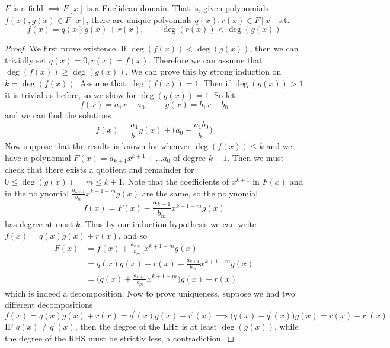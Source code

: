   \begin{theorem}
    $F$ is a field $\implies F[x]$ is a Euclidean domain. That is, given polynomials $f(x), g(x) \in F[x]$, there are unique polyomials $q(x), r(x) \in F[x]$ s.t. 
    \begin{equation}
      f(x) = q(x) g(x) + r(x), \qquad \deg(r(x)) < \deg(g(x))
    \end{equation} 
  \end{theorem} 
  \begin{proof}
    We first prove existence. If $\deg(f(x)) < \deg(g(x))$, then we can trivially set $q(x) = 0, r(x) = f(x)$. Therefore we can assume that $\deg(f(x)) \geq \deg(g(x))$. We can prove this by strong induction on $k = \deg(f(x))$. Assume that $\deg(f(x)) = 1$. Then if $\deg(g(x)) > 1$ it is trivial as before, so we show for $\deg(g(x)) = 1$. So let 
    \begin{equation}
      f(x) = a_1 x + a_0, \qquad g(x) = b_1 x + b_0 
    \end{equation}
    and we can find the solutions 
    \begin{equation}
      f(x) = \frac{a_1}{b_1} g(x) + \bigg( a_0 - \frac{a_1 b_0}{b_1} \bigg)
    \end{equation} 
    Now suppose that the results is known for whenver $\deg(f(x)) \leq k$ and we have a polynomial $F(x) = a_{k+1} x^{k+1} + \ldots a_0$ of degree $k+1$. Then we must check that there exists a quotient and remainder for $0 \leq \deg(g(x)) = m \leq k + 1$. Note that the coefficients of $x^{k+1}$ in $F(x)$ and in the polynomial $\frac{a_{k+1}}{b_m} x^{k+1-m} g(x)$ are the same, so the polynomial 
    \begin{equation}
      f(x) = F(x) - \frac{a_{k+1}}{b_m} x^{k+1-m} g(x) 
    \end{equation}
    has degree at most $k$. Thus by our induction hypothesis we can write $f(x) = q(x) g(x) + r(x)$, and so 
    \begin{align}
      F(x) & = f(x) + \frac{a_{k+1}}{b_m} x^{k+1-m} g(x) \\
           & = q(x) g(x) + r(x) + \frac{a_{k+1}}{b_m} x^{k+1-m} g(x) \\ 
           & = \bigg( q(x) + \frac{a_{k+1}}{b_m} x^{k+1-m} \bigg) g(x) + r(x)
    \end{align} 
    which is indeed a decomposition. Now to prove uniqueness, suppose we had two different decompositions 
    \begin{equation}
      f(x) = q(x) g(x) + r(x) = q^\prime (x) g(x) + r^\prime (x) \implies \big( q(x) - q^\prime (x) \big) g(x) = r(x) - r^\prime (x)  
    \end{equation}  
    IF $q(x) \neq q^\prime (x)$, then the degree of the LHS is at least $\deg(g(x))$, while the degree of the RHS must be strictly less, a contradiction. 
  \end{proof}

